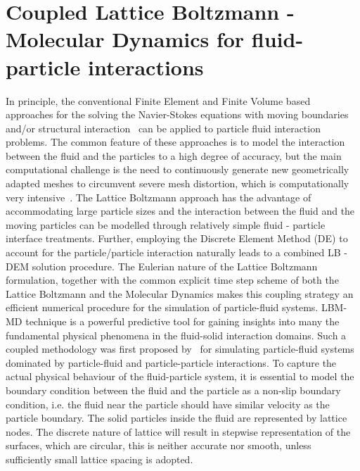 \section{Coupled Lattice Boltzmann - Molecular Dynamics for fluid-particle interactions}
In principle, the conventional Finite Element and Finite Volume based approaches for the solving the Navier-Stokes equations with moving boundaries and/or structural interaction~\citep{bathe2004} can be applied to particle fluid interaction problems. The common feature of these approaches is to model the interaction between the fluid and the particles to a high degree of accuracy, but the main computational challenge is the need to continuously generate new geometrically adapted meshes to circumvent severe mesh distortion, which is computationally very intensive~\citep{han2007}. The Lattice Boltzmann approach has the advantage of accommodating large particle sizes and the interaction between the fluid and the moving particles can be modelled through relatively simple fluid - particle interface treatments. Further, employing the Discrete Element Method (DE) to account for the particle/particle interaction naturally leads to a combined LB - DEM solution procedure. The Eulerian nature of the Lattice Boltzmann formulation, together with the common explicit time step scheme of both the Lattice Boltzmann and the Molecular Dynamics makes this coupling strategy an efficient numerical procedure for the simulation of particle-fluid systems. LBM-MD technique is a powerful predictive tool for gaining insights into many the fundamental physical phenomena in the fluid-solid interaction domains. Such a coupled methodology was first proposed by~\citep{cook2004} for simulating particle-fluid systems dominated by particle-fluid and particle-particle interactions. To capture the actual physical behaviour of the fluid-particle system, it is essential to model the boundary condition between the fluid and the particle as a non-slip boundary condition, i.e. the fluid near the particle should have similar velocity as the particle boundary. The solid particles inside the fluid are represented by lattice nodes. The discrete nature of lattice will result in stepwise representation of the surfaces, which are circular, this is neither accurate nor smooth, unless sufficiently small lattice spacing is adopted. 


